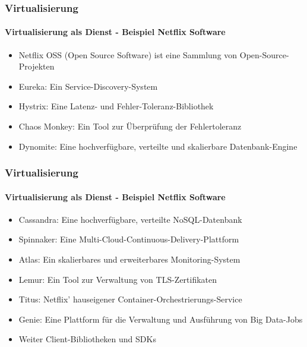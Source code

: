 \begin{frame}
  \frametitle{Virtualisierung}
  \framesubtitle{Virtualisierung als Dienst - Beispiel Netflix Software}
  \begin{itemize}
    \item Netflix OSS (Open Source Software) ist eine Sammlung von Open-Source-Projekten
    \item Eureka: Ein Service-Discovery-System
    \item Hystrix: Eine Latenz- und Fehler-Toleranz-Bibliothek
    \item Chaos Monkey: Ein Tool zur Überprüfung der Fehlertoleranz 
    \item Dynomite: Eine hochverfügbare, verteilte und skalierbare Datenbank-Engine
  \end{itemize}
\end{frame}

 \begin{frame}
  \frametitle{Virtualisierung}
  \framesubtitle{Virtualisierung als Dienst - Beispiel Netflix Software}
  \begin{itemize}   
    \item Cassandra: Eine hochverfügbare, verteilte NoSQL-Datenbank
    \item Spinnaker: Eine Multi-Cloud-Continuous-Delivery-Plattform
    \item Atlas: Ein skalierbares und erweiterbares Monitoring-System
    \item Lemur: Ein Tool zur Verwaltung von TLS-Zertifikaten
    \item Titus: Netflix' hauseigener Container-Orchestrierungs-Service
    \item Genie: Eine Plattform für die Verwaltung und Ausführung von Big Data-Jobs
    \item Weiter Client-Bibliotheken und SDKs
  \end{itemize}
\end{frame}


